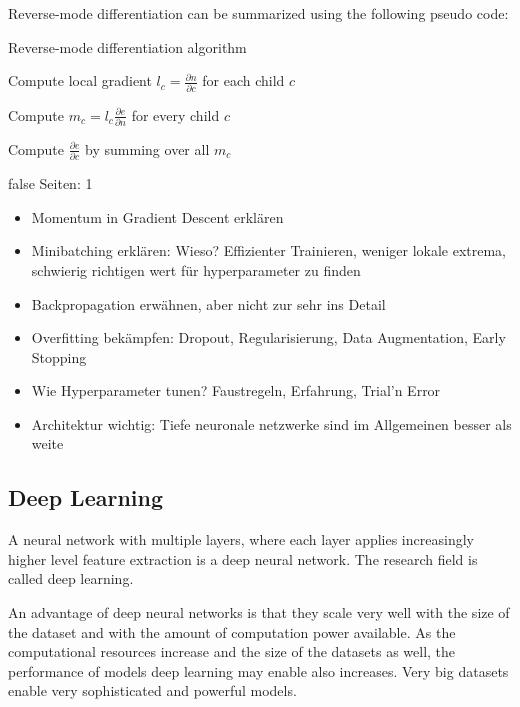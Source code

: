 \documentclass[draft,final,oneside]{vutinfth} %
\begin{document}
Reverse-mode differentiation can be summarized using the following pseudo code:

\begin{algorithm}
\caption{Reverse-mode differentiation algorithm \cite{dlvc}}

 {

Compute local gradient $l_c = \frac{\partial n}{\partial c}$ for each child $c$

Compute $m_c = l_c  \frac{\partial e}{\partial n}$ for every child $c$

Compute $\frac{\partial e}{\partial c}$ by summing over all $m_c$

}

\end{algorithm}

\if false
Seiten: 1
\begin{itemize}

\item Momentum in Gradient Descent erklären
\item Minibatching erklären: Wieso? Effizienter Trainieren, weniger lokale extrema, schwierig richtigen wert für hyperparameter zu finden
\item Backpropagation erwähnen, aber nicht zur sehr ins Detail
\item Overfitting bekämpfen: Dropout, Regularisierung, Data Augmentation, Early Stopping
\item Wie Hyperparameter tunen? Faustregeln, Erfahrung, Trial'n Error
\item Architektur wichtig: Tiefe neuronale netzwerke sind im Allgemeinen besser als weite

\end{itemize}
\fi

\subsection{Deep Learning} \label{dlbackground}

A neural network with multiple layers, where each layer applies increasingly higher level feature extraction is a deep neural network. The research field is called deep learning.

An advantage of deep neural networks is that they scale very well with the size of the dataset and with the amount of computation power available. As the computational resources increase and the size of the datasets as well, the performance of models deep learning may enable also increases. Very big datasets enable very sophisticated and powerful models.
\end{document}
